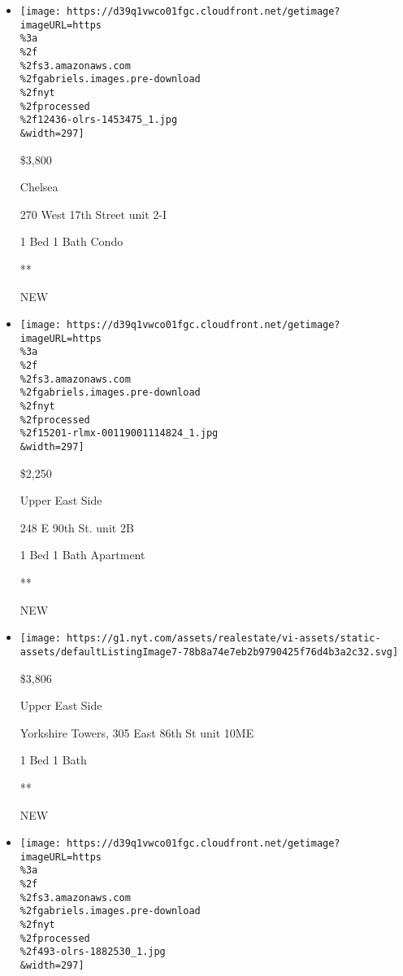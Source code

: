 \begin{itemize}
\item
  \href{/real-estate/usa/ny/new-york/chelsea/homes-for-rent/270-west-17th-street/12436-OLRS-1453475?}{}

  \texttt{[image: https://d39q1vwco01fgc.cloudfront.net/getimage?imageURL=https\\\%3a\\\%2f\\\%2fs3.amazonaws.com\\\%2fgabriels.images.pre-download\\\%2fnyt\\\%2fprocessed\\\%2f12436-olrs-1453475\_1.jpg\\\&width=297]}

  \$3,800

  Chelsea

  270 West 17th Street unit 2-I

  1 Bed \textbar{} 1 Bath \textbar{} Condo

  **

  NEW
\item
  \href{/real-estate/usa/ny/new-york/upper-east-side/homes-for-rent/248-e-90th-st/15201-RLMX-00119001114824?}{}

  \texttt{[image: https://d39q1vwco01fgc.cloudfront.net/getimage?imageURL=https\\\%3a\\\%2f\\\%2fs3.amazonaws.com\\\%2fgabriels.images.pre-download\\\%2fnyt\\\%2fprocessed\\\%2f15201-rlmx-00119001114824\_1.jpg\\\&width=297]}

  \$2,250

  Upper East Side

  248 E 90th St. unit 2B

  1 Bed \textbar{} 1 Bath \textbar{} Apartment

  **

  NEW
\item
  \href{/real-estate/usa/ny/new-york/upper-east-side/homes-for-rent/yorkshire-towers-305-east-86th-st/46-4322149?}{}

  \texttt{[image: https://g1.nyt.com/assets/realestate/vi-assets/static-assets/defaultListingImage7-78b8a74e7eb2b9790425f76d4b3a2c32.svg]}

  \$3,806

  Upper East Side

  Yorkshire Towers, 305 East 86th St unit 10ME

  1 Bed \textbar{} 1 Bath \textbar{}

  **

  NEW
\item
  \href{/real-estate/usa/ny/new-york/financial-district/homes-for-rent/15-william-street/493-OLRS-1882530?}{}

  \texttt{[image: https://d39q1vwco01fgc.cloudfront.net/getimage?imageURL=https\\\%3a\\\%2f\\\%2fs3.amazonaws.com\\\%2fgabriels.images.pre-download\\\%2fnyt\\\%2fprocessed\\\%2f493-olrs-1882530\_1.jpg\\\&width=297]}


\end{itemize}
